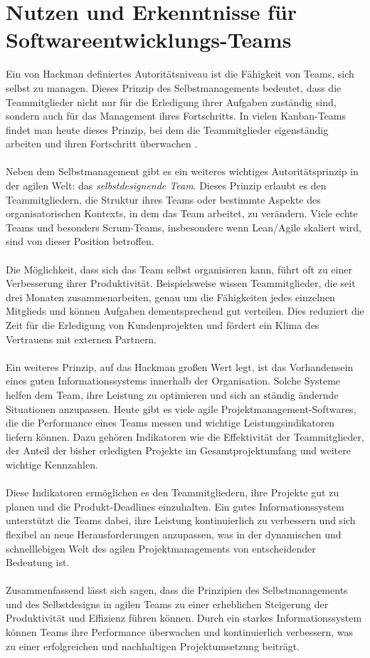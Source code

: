 \chapter{Nutzen und Erkenntnisse für Softwareentwicklungs-Teams}
Ein von Hackman definiertes Autoritätsniveau ist die Fähigkeit von Teams, sich selbst zu managen. Dieses Prinzip des Selbstmanagements bedeutet, dass die Teammitglieder nicht nur für die Erledigung ihrer Aufgaben zuständig sind, sondern auch für das Management ihres Fortschritts. In vielen Kanban-Teams findet man heute dieses Prinzip, bei dem die Teammitglieder eigenständig arbeiten und ihren Fortschritt überwachen \cite{RolandWanner}.\\\\
Neben dem Selbstmanagement gibt es ein weiteres wichtiges Autoritätsprinzip in der agilen Welt: das \textit{selbstdesignende Team}. Dieses Prinzip erlaubt es den Teammitgliedern, die Struktur ihres Teams oder bestimmte Aspekte des organisatorischen Kontexts, in dem das Team arbeitet, zu verändern. Viele echte Teams und besonders Scrum-Teams, insbesondere wenn Lean/Agile skaliert wird, sind von dieser Position betroffen.\\\\
Die Möglichkeit, dass sich das Team selbst organisieren kann, führt oft zu einer Verbesserung ihrer Produktivität. Beispielsweise wissen Teammitglieder, die seit drei Monaten zusammenarbeiten, genau um die Fähigkeiten jedes einzelnen Mitglieds und können Aufgaben dementsprechend gut verteilen. Dies reduziert die Zeit für die Erledigung von Kundenprojekten und fördert ein Klima des Vertrauens mit externen Partnern.\\\\
Ein weiteres Prinzip, auf das Hackman großen Wert legt, ist das Vorhandensein eines guten Informationssystems innerhalb der Organisation. Solche Systeme helfen dem Team, ihre Leistung zu optimieren und sich an ständig ändernde Situationen anzupassen. Heute gibt es viele agile Projektmanagement-Softwares, die die Performance eines Teams messen und wichtige Leistungsindikatoren liefern können. Dazu gehören Indikatoren wie die Effektivität der Teammitglieder, der Anteil der bisher erledigten Projekte im Gesamtprojektumfang und weitere wichtige Kennzahlen.\\\\
Diese Indikatoren ermöglichen es den Teammitgliedern, ihre Projekte gut zu planen und die Produkt-Deadlines einzuhalten. Ein gutes Informationssystem unterstützt die Teams dabei, ihre Leistung kontinuierlich zu verbessern und sich flexibel an neue Herausforderungen anzupassen, was in der dynamischen und schnelllebigen Welt des agilen Projektmanagements von entscheidender Bedeutung ist.\\\\
Zusammenfassend lässt sich sagen, dass die Prinzipien des Selbstmanagements und des Selbstdesigns in agilen Teams zu einer erheblichen Steigerung der Produktivität und Effizienz führen können. Durch ein starkes Informationssystem können Teams ihre Performance überwachen und kontinuierlich verbessern, was zu einer erfolgreichen und nachhaltigen Projektumsetzung beiträgt.

